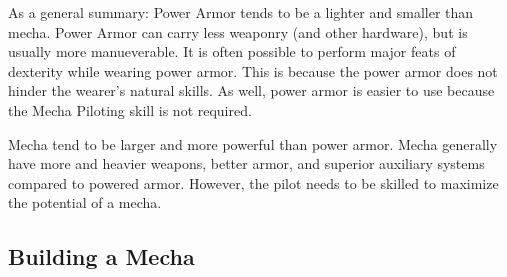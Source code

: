 \documentclass[twoside]{book}
\begin{document}
    {  
    As a general summary: Power Armor tends to be a lighter and smaller than mecha. Power Armor can carry less weaponry (and other hardware), but is usually more manueverable. It is often possible to perform major feats of dexterity while wearing power armor. This is because the power armor does not hinder the wearer's natural skills. As well, power armor is easier to use because the Mecha Piloting skill is not required.
    }
  
    {  
    Mecha tend to be larger and more powerful than power armor. Mecha generally have more and heavier weapons, better armor, and superior auxiliary systems compared to powered armor. However, the pilot needs to be skilled to maximize the potential of a mecha.
    }
  
    

\subsection{Building a Mecha}
    
\end{document}
